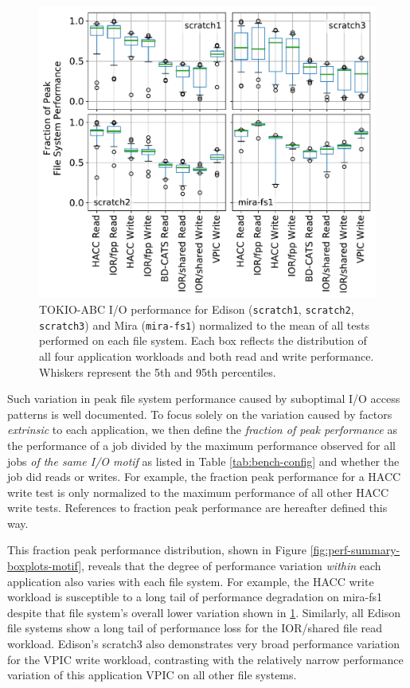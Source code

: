 \documentclass[conference,10pt,compsocconf]{IEEEtran}
\begin{document}
\begin{figure}[t]
    \centering
    \includegraphics[width=1.0\columnwidth]{figs/perf-boxplots-per-fs.pdf}
    \caption{TOKIO-ABC I/O performance for Edison (\texttt{scratch1},
    \texttt{scratch2}, \texttt{scratch3}) and Mira (\texttt{mira-fs1}) normalized to
    the mean of all tests performed on each file system.  Each box reflects the
    distribution of all four application workloads and both read and write
    performance. Whiskers represent the 5th and 95th percentiles.}
    \label{fig:perf-summary-boxplots-fs}
\end{figure}

Such variation in peak file system performance caused by suboptimal I/O access patterns is well documented\cite{Lofstead2010,Uselton2010,Xie2012}.
To focus solely on the variation caused by factors \emph{extrinsic} to each application, we then define the \emph{fraction of peak performance} as the performance of a job divided by the maximum performance observed for all jobs \emph{of the same I/O motif} as listed in Table \ref{tab:bench-config} and whether the job did reads or writes.
For example, the fraction peak performance for a HACC write test is only normalized to the maximum performance of all other HACC write tests.
References to fraction peak performance are hereafter defined this way.

This fraction peak performance distribution, shown in Figure \ref{fig:perf-summary-boxplots-motif}, reveals that the degree of performance variation \emph{within} each application also varies with each file system.
For example, the HACC write workload is susceptible to a long tail of performance degradation on mira-fs1 despite
that file system's overall lower variation shown in \ref{fig:perf-summary-boxplots-fs}.
Similarly, all Edison file systems show a long tail of performance loss for the IOR/shared file read workload.
Edison's scratch3 also demonstrates very broad performance variation for the VPIC write workload, contrasting with the relatively narrow performance variation of this application VPIC on all other file systems.
\end{document}
